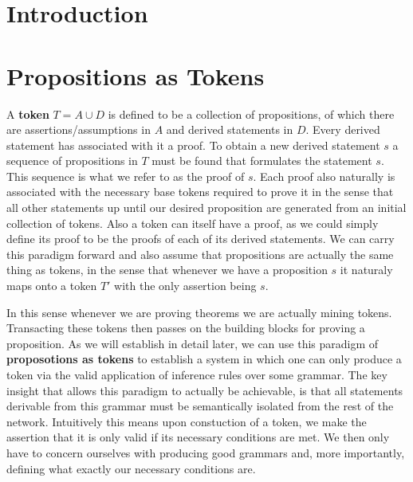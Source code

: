 \documentclass[12pt]{amsart}
\begin{document}
\newtheorem{thm}{\noindent\bf Theorem:}[section]
\newtheorem{lem}{\noindent\bf Lemma:}[section]
\newtheorem{cor}{\noindent\bf Corrallary:}[section]
\newenvironment{myproof}{\noindent\textbf{Proof:}}{QED }
\newcommand{\N}{\mathbb{N}}
\newcommand{\bigO}{\mathbb{O}}
\newcommand{\pyspace}{\hspace{12pt}}


\section{Introduction}


\section{Propositions as Tokens}
A \textbf{token} $T = A\cup D$ is defined to be a collection of propositions, of which there are assertions/assumptions in $A$ and derived statements in $D$. Every derived statement has associated with it a proof. To obtain a new derived statement $s$ a sequence of propositions in $T$ must be found that formulates the statement $s$. This sequence is what we refer to as the proof of $s$. Each proof also naturally is associated with the necessary base tokens required to prove it in the sense that all other statements up until our desired proposition are generated from an initial collection of tokens. Also a token can itself have a proof, as we could simply define its proof to be the proofs of each of its derived statements. We can carry this paradigm forward and also assume that propositions are actually the same thing as tokens, in the sense that whenever we have a proposition $s$ it naturaly maps onto a token $T'$ with the only assertion being $s$. \newline

In this sense whenever we are proving theorems we are actually mining tokens. Transacting these tokens then passes on the building blocks for proving a proposition. As we will establish in detail later, we can use this paradigm of \textbf{proposotions as tokens} to establish a system in which one can only produce a token via the valid application of inference rules over some grammar. The key insight that allows this paradigm to actually be achievable, is that all statements derivable from this grammar must be semantically isolated from the rest of the network. Intuitively this means upon constuction of a token, we make the assertion that it is only valid if its necessary conditions are met. We then only have to concern ourselves with producing good grammars and, more importantly, defining what exactly our necessary conditions are.
\end{document}
